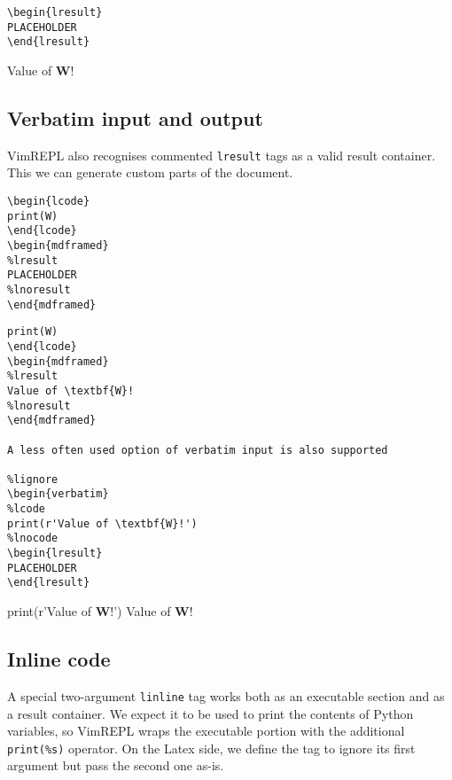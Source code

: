 \documentclass{article}
\newenvironment{lcode}
  {\VerbatimEnvironment
   \begin{verbatim}}
  {\end{verbatim}}
\newenvironment{lresult}{\verbatim}{\endverbatim}
\begin{document}
\begin{verbatim}
\begin{lresult}
PLACEHOLDER
\end{lresult}
\end{verbatim}

\begin{lresult}
Value of \textbf{W}!
\end{lresult}

\subsection{Verbatim input and output}

VimREPL also recognises commented \texttt{lresult} tags as a valid result
container. This we can generate custom parts of the document.

\begin{verbatim}
\begin{lcode}
print(W)
\end{lcode}
\begin{mdframed}
%lresult
PLACEHOLDER
%lnoresult
\end{mdframed}
\end{verbatim}

\begin{lcode}
print(W)
\end{lcode}
\begin{mdframed}
Value of \textbf{W}!
\end{mdframed}

A less often used option of verbatim input is also supported

\begin{verbatim}
%lcode
print(r'Value of \textbf{W}!')
%lnocode
\begin{lresult}
PLACEHOLDER
\end{lresult}
\end{verbatim}

print(r'Value of \textbf{W}!')
\begin{lresult}
Value of \textbf{W}!
\end{lresult}

\subsection{Inline code}

A special two-argument \texttt{linline} tag works both as an executable section
and as a result container. We expect it to be used to print the contents of
Python variables, so VimREPL wraps the executable portion with the additional
\texttt{print(\%s)} operator. On the Latex side, we define the tag to ignore its
first argument but pass the second one as-is.
\end{document}

